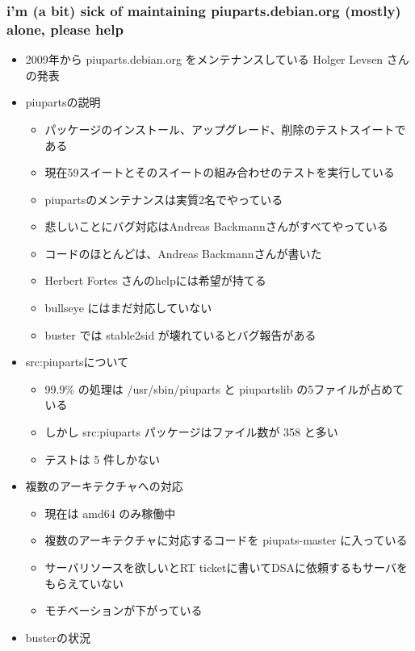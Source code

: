 \documentclass[mingoth,a4paper]{jsarticle}
\begin{document}
\subsubsection{i'm (a bit) sick of maintaining piuparts.debian.org (mostly) alone, please help}

\begin{itemize}
\item 2009年から piuparts.debian.org をメンテナンスしている Holger Levsen さんの発表 
\item piupartsの説明
  \begin{itemize}
  \item パッケージのインストール、アップグレード、削除のテストスイートである
  \item 現在59スイートとそのスイートの組み合わせのテストを実行している
  \item piupartsのメンテナンスは実質2名でやっている
  \item 悲しいことにバグ対応はAndreas Backmannさんがすべてやっている
  \item コードのほとんどは、Andreas Backmannさんが書いた
  \item Herbert Fortes さんのhelpには希望が持てる
  \item bullseye にはまだ対応していない
  \item buster では stable2sid が壊れているとバグ報告がある
  \end{itemize}
\item src:piupartsについて
  \begin{itemize}
  \item 99.9\% の処理は /usr/sbin/piuparts と piupartslib の5ファイルが占めている
  \item しかし src:piuparts パッケージはファイル数が 358 と多い
  \item テストは 5 件しかない
  \end{itemize}
\item 複数のアーキテクチャへの対応
  \begin{itemize}
  \item 現在は amd64 のみ稼働中
  \item 複数のアーキテクチャに対応するコードを piupats-master に入っている
  \item サーバリソースを欲しいとRT ticketに書いてDSAに依頼するもサーバをもらえていない
  \item モチベーションが下がっている
  \end{itemize}
\item busterの状況
  \begin{itemize}

\end{itemize}
\end{itemize}
\end{document}
